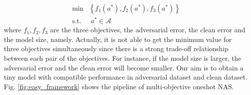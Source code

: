 \documentclass[journal]{IEEEtran}
\newcommand{\revised}[1]{{\color{black} #1}}
\begin{document}
\begin{equation}\label{eq:multi_objective_definition}
\begin{aligned}
    \min& \left \{f_{1}(a^{*}), f_{2}(a^{*}), f_{3}(a^{*})\right \}\\
    \textrm{s.t.}&\; a^{*} \in \mathcal{A}
\end{aligned}
\end{equation}
\revised{where $f_{1}, f_{2}, f_{3}$ are the three objectives, the adversarial error, the clean error and the model size, namely. Actually, it is not able to get the minimum value for three objectives simultaneously since there is a strong trade-off relationship between each pair of the objectives. For instance, if the model size is larger, the adversarial error and the clean error will become smaller. Our aim is to obtain a tiny model with compatible performance in adversarial dataset and clean dataset. Fig. \ref{fig:easy_framework} shows the pipeline of multi-objective oneshot NAS.}
\end{document}
